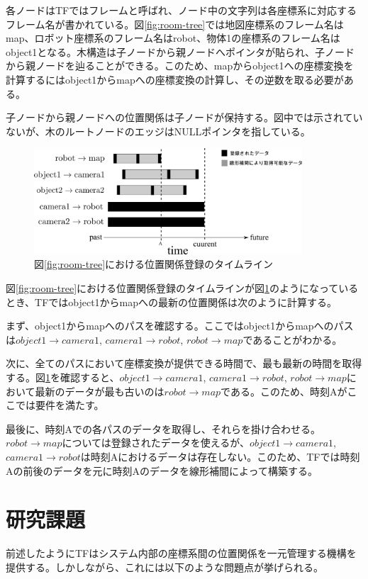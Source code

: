\documentclass[a4paper]{jreport}	%
\begin{document}
各ノードはTFではフレームと呼ばれ、ノード中の文字列は各座標系に対応するフレーム名が書かれている。図\ref{fig:room-tree}では地図座標系のフレーム名はmap、ロボット座標系のフレーム名はrobot、物体1の座標系のフレーム名はobject1となる。木構造は子ノードから親ノードへポインタが貼られ、子ノードから親ノードを辿ることができる。このため、mapからobject1への座標変換を計算するにはobject1からmapへの座標変換の計算し、その逆数を取る必要がある。

子ノードから親ノードへの位置関係は子ノードが保持する。図中では示されていないが、木のルートノードのエッジはNULLポインタを指している。


\begin{figure}[h] 
\centering
\includegraphics[width=10cm]{room-timeline}	
\caption{図\ref{fig:room-tree}における位置関係登録のタイムライン}
\label{fig:room-timeline}
\end{figure}

図\ref{fig:room-tree}における位置関係登録のタイムラインが図\ref{fig:room-timeline}のようになっているとき、TFではobject1からmapへの最新の位置関係は次のように計算する。

まず、object1からmapへのパスを確認する。ここではobject1からmapへのパスは$object1 \rightarrow camera1$, $camera1 \rightarrow robot$, $robot \rightarrow map$であることがわかる。

次に、全てのパスにおいて座標変換が提供できる時間で、最も最新の時間を取得する。図\ref{fig:room-timeline}を確認すると、$object1 \rightarrow camera1$, $camera1 \rightarrow robot$, $robot \rightarrow map$において最新のデータが最も古いのは$robot \rightarrow map$である。このため、時刻Aがここでは要件を満たす。

最後に、時刻Aでの各パスのデータを取得し、それらを掛け合わせる。$robot \rightarrow map$については登録されたデータを使えるが、$object1 \rightarrow camera1$, $camera1 \rightarrow robot$は時刻Aにおけるデータは存在しない。このため、TFでは時刻Aの前後のデータを元に時刻Aのデータを線形補間によって構築する。


\section{研究課題}
前述したようにTFはシステム内部の座標系間の位置関係を一元管理する機構を提供する。しかしながら、これには以下のような問題点が挙げられる。
\end{document}
